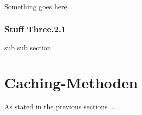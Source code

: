 Something goes here.

\subsubsection{Stuff Three.2.1}
\label{sss:stuff3.2.1}

sub sub section

\section{Caching-Methoden}
\label{s:stuff4}

As stated in the previous sections ...






















